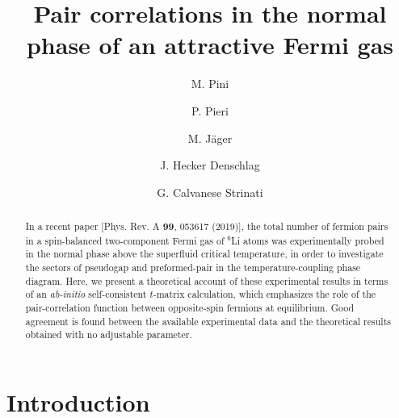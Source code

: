 \documentclass[pra,twocolumn,aps,amssymb,showpacs,superscriptaddress]{revtex4-1}
\begin{document}
\title{Pair correlations in the normal phase of an attractive Fermi gas}

\author{M. Pini}
\author{P. Pieri}
\author{M. J\"{a}ger}
\author{J. Hecker Denschlag}
\author{G. Calvanese Strinati}



\begin{abstract}
In a recent paper [Phys. Rev. A {\bf 99}, 053617 (2019)], the total number of fermion pairs in a spin-balanced two-component Fermi gas of $^{6}$Li atoms was experimentally probed in the normal phase above the superfluid critical temperature, in order to investigate the sectors of pseudogap and preformed-pair in the temperature-coupling phase diagram. Here, we present a theoretical account of these experimental results in terms of an \emph{ab-initio} self-consistent \mbox{$t$-matrix} calculation, which emphasizes the role of the pair-correlation function between opposite-spin fermions at equilibrium. 
Good agreement is found between the available experimental data and the theoretical results obtained with no adjustable parameter.
\end{abstract}

\maketitle

\section{Introduction} 
\label{sec:introduction}
\end{document}
